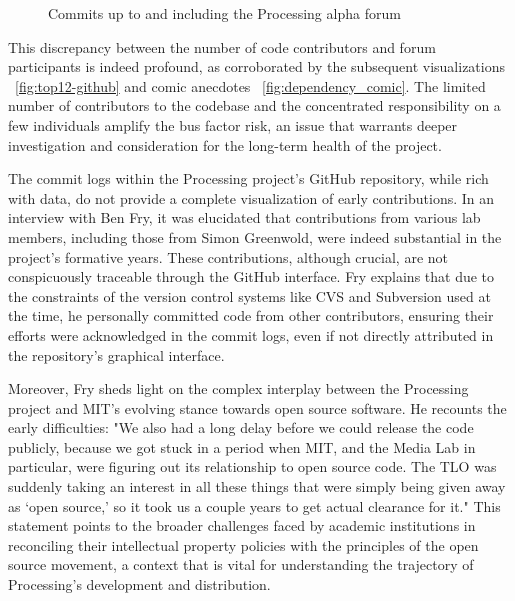 \begin{figure}[h!]
	\centering
	
	\caption{Commits up to and including the Processing alpha forum}
	\label{fig:alpha-commits}
\end{figure}

This discrepancy between the number of code contributors and forum participants is indeed profound, as corroborated by the subsequent visualizations ~\ref{fig:top12-github} and comic anecdotes ~\ref{fig:dependency_comic}. The limited number of contributors to the codebase and the concentrated responsibility on a few individuals amplify the bus factor risk, an issue that warrants deeper investigation and consideration for the long-term health of the project.






The commit logs within the Processing project's GitHub repository, while rich with data, do not provide a complete visualization of early contributions. In an interview with Ben Fry, it was elucidated that contributions from various lab members, including those from Simon Greenwold, were indeed substantial in the project's formative years. These contributions, although crucial, are not conspicuously traceable through the GitHub interface. Fry explains that due to the constraints of the version control systems like CVS and Subversion used at the time, he personally committed code from other contributors, ensuring their efforts were acknowledged in the commit logs, even if not directly attributed in the repository's graphical interface.

Moreover, Fry sheds light on the complex interplay between the Processing project and MIT's evolving stance towards open source software. He recounts the early difficulties: "We also had a long delay before we could release the code publicly, because we got stuck in a period when MIT, and the Media Lab in particular, were figuring out its relationship to open source code. The TLO was suddenly taking an interest in all these things that were simply being given away as ‘open source,’ so it took us a couple years to get actual clearance for it." This statement points to the broader challenges faced by academic institutions in reconciling their intellectual property policies with the principles of the open source movement, a context that is vital for understanding the trajectory of Processing's development and distribution.

